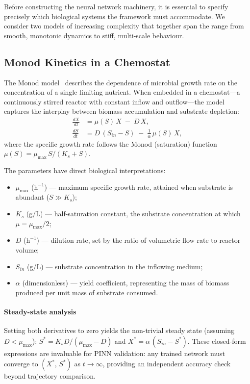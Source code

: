 \documentclass[14pt,a4paper,openany]{extbook}
\begin{document}
Before constructing the neural network machinery, it is essential to specify
precisely which biological systems the framework must accommodate.  We
consider two models of increasing complexity that together span the range
from smooth, monotonic dynamics to stiff, multi-scale behaviour.

\subsection{Monod Kinetics in a Chemostat}
\label{subsec:monod}

The Monod model~\cite{monod1949} describes the dependence of microbial
growth rate on the concentration of a single limiting nutrient.  When
embedded in a chemostat---a continuously stirred reactor with constant
inflow and outflow---the model captures the interplay between biomass
accumulation and substrate depletion:
%
\begin{align}
\label{eq:monod_x}
\frac{dX}{dt} &= \mu(S)\, X \;-\; D\, X, \\[6pt]
\label{eq:monod_s}
\frac{dS}{dt} &= D\,(S_{in} - S) \;-\;
                  \frac{1}{\alpha}\,\mu(S)\, X,
\end{align}
%
where the specific growth rate follows the Monod (saturation) function
$\mu(S) = \mu_{\max}\, S / (K_s + S)$.

The parameters have direct biological interpretations:
%
\begin{itemize}
    \item $\mu_{\max}$ ($\mathrm{h}^{-1}$) --- maximum specific growth
          rate, attained when substrate is abundant ($S \gg K_s$);
    \item $K_s$ (g/L) --- half-saturation constant, the substrate
          concentration at which $\mu = \mu_{\max}/2$;
    \item $D$ ($\mathrm{h}^{-1}$) --- dilution rate, set by the ratio of
          volumetric flow rate to reactor volume;
    \item $S_{in}$ (g/L) --- substrate concentration in the inflowing
          medium;
    \item $\alpha$ (dimensionless) --- yield coefficient, representing the
          mass of biomass produced per unit mass of substrate consumed.
\end{itemize}

\paragraph{Steady-state analysis}
Setting both derivatives to zero yields the non-trivial steady state
(assuming $D < \mu_{\max}$): $S^{*} = K_s D / (\mu_{\max} - D)$ and
$X^{*} = \alpha\,(S_{in} - S^{*})$.  These closed-form expressions are
invaluable for PINN validation: any trained network must converge to
$(X^{*},\, S^{*})$ as $t \to \infty$, providing an independent accuracy
check beyond trajectory comparison.
\end{document}
